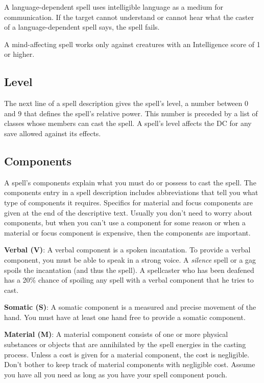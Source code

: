 A language-dependent spell uses intelligible language as a medium for communication. If the target cannot understand or cannot hear what the caster of a language-dependent spell says, the spell fails.
				
A mind-affecting spell works only against creatures with an Intelligence score of 1 or higher.
				
\subsection{Level}

				
The next line of a spell description gives the spell's level, a number between 0 and 9 that defines the spell's relative power. This number is preceded by a list of classes whose members can cast the spell. A spell's level affects the DC for any save allowed against its effects.
				
\subsection{Components}

				
A spell's components explain what you must do or possess to cast the spell. The components entry in a spell description includes abbreviations that tell you what type of components it requires. Specifics for material and focus components are given at the end of the descriptive text. Usually you don't need to worry about components, but when you can't use a component for some reason or when a material or focus component is expensive, then the components are important.
				
\textbf{Verbal (V)}: A verbal component is a spoken incantation. To provide a verbal component, you must be able to speak in a strong voice. A \textit{silence }spell or a gag spoils the incantation (and thus the spell). A spellcaster who has been deafened has a 20\% chance of spoiling any spell with a verbal component that he tries to cast.
				
\textbf{Somatic (S)}: A somatic component is a measured and precise movement of the hand. You must have at least one hand free to provide a somatic component.
				
\textbf{Material (M)}: A material component consists of one or more physical substances or objects that are annihilated by the spell energies in the casting process. Unless a cost is given for a material component, the cost is negligible. Don't bother to keep track of material components with negligible cost. Assume you have all you need as long as you have your spell component pouch.
				
